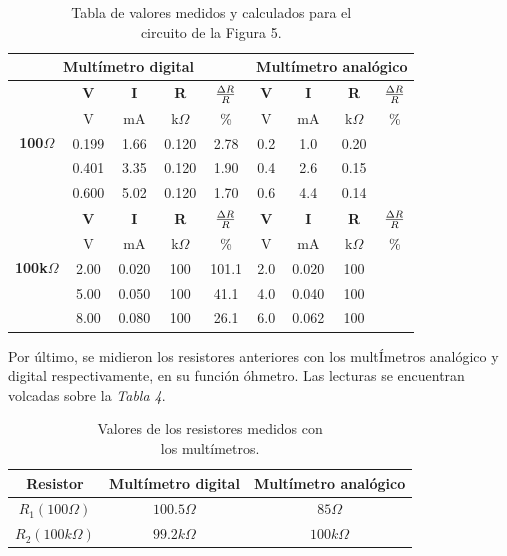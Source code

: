 \documentclass{article}
\begin{document}
\begin{table}[!hbt]
	\begin{center}

		\begin{tabular}{|c|c|c|c|c|c|c|c|c|} \hline
			\multicolumn{5}{|c|}{\textbf{Multímetro digital}} & \multicolumn{4}{|c|}{\textbf{Multímetro analógico}} \\ \hline
			\multirow{5}{*}{\textbf{100$\Omega$}} 
			& \textbf{V} & \textbf{I} & \textbf{R} & \textbf{${\Delta R \over R}$} & \textbf{V} & \textbf{I} & \textbf{R} & \textbf{${\Delta R \over R}$} \\\cline{2-9}
			& V & mA & k$\Omega$ & \% & V & mA & k$\Omega$ & \% \\\cline{2-9}
			& 0.199 & 1.66 & 0.120 & 2.78 & 0.2 & 1.0 & 0.20 &  \\\cline{2-9}
			& 0.401 & 3.35 & 0.120 & 1.90 & 0.4 & 2.6 & 0.15 &  \\\cline{2-9}
			& 0.600 & 5.02 & 0.120 & 1.70 & 0.6 & 4.4 & 0.14 &  \\ \hline
			\multirow{5}{*}{\textbf{100k$\Omega$}} 
			& \textbf{V} & \textbf{I} & \textbf{R} & \textbf{${\Delta R \over R}$} & \textbf{V} & \textbf{I} & \textbf{R} & \textbf{${\Delta R \over R}$} \\\cline{2-9}
			& V & mA & k$\Omega$ & \% & V & mA & k$\Omega$ & \% \\\cline{2-9}
			& 2.00 & 0.020 & 100 & 101.1 & 2.0 & 0.020 & 100 &  \\\cline{2-9}
			& 5.00 & 0.050 & 100 & 41.1 & 4.0 & 0.040 & 100 &  \\\cline{2-9}
			& 8.00 & 0.080 & 100 & 26.1 & 6.0 & 0.062 & 100 &  \\ \hline
		\end{tabular}

	\caption{Tabla de valores medidos y calculados para el\\ circuito de la Figura 5.}
	\end{center}
\end{table}
\bigskip




	Por último, se midieron los resistores anteriores con los multÍmetros analógico y digital respectivamente, en su función óhmetro. Las lecturas se encuentran volcadas sobre la \textit{Tabla 4}.
\bigskip\bigskip


\begin{table}[!hbt]
	\begin{center}
	\begin{tabular}{|c|c|c|}
		\hline
		\textbf{Resistor} & \textbf{Multímetro digital} & \textbf{Multímetro analógico} \\
		\hline
		$R_1 (100\Omega)$ & $100.5\Omega$ & $85\Omega$ \\
		\hline
		$R_2 (100k\Omega)$ & $99.2k\Omega$ & $100k\Omega$ \\
		\hline
	\end{tabular}
	\caption{Valores de los resistores medidos con\\ los multímetros.}
	\end{center}
\end{table}
\end{document}
